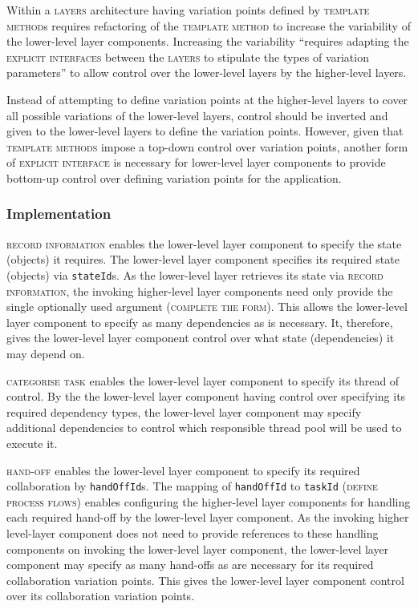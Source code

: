 \documentclass[prodmode]{style/acmlarge}
\begin{document}
Within a \textsc{layers} architecture having variation points defined by
\textsc{template method}s requires refactoring of the \textsc{template method}
to increase the variability of the lower-level layer components.  Increasing the
variability ``requires adapting the \textsc{explicit interfaces} between the
\textsc{layers} to stipulate the types of variation parameters'' \cite[p.
5]{ioc} to allow control over the lower-level layers by the higher-level layers.

Instead of attempting to define variation points at the higher-level layers to
cover all possible variations of the lower-level layers, control should be
inverted and given to the lower-level layers to define the variation points. 
However, given that \textsc{template methods} impose a top-down control over
variation points, another form of \textsc{explicit interface} is necessary for
lower-level layer components to provide bottom-up control over defining
variation points for the application.



\subsubsection*{Implementation}

\textsc{record information} enables the lower-level layer component to specify
the state (objects) it requires.  The lower-level layer component specifies its
required state (objects) via \texttt{stateId}s.  As the lower-level layer
retrieves its state via \textsc{record information}, the invoking higher-level
layer components need only provide the single optionally used argument
(\textsc{complete the form}).  This allows the lower-level layer component to
specify as many dependencies as is necessary.  It, therefore, gives the
lower-level layer component control over what state (dependencies) it
may depend on.

\textsc{categorise task} enables the lower-level layer component to specify its
thread of control.  By the the lower-level layer component having control over
specifying its required dependency types, the lower-level layer component may
specify additional dependencies to control which responsible thread pool will be
used to execute it.

\textsc{hand-off} enables the lower-level layer component to specify its
required collaboration by \texttt{handOffId}s.  The mapping of
\texttt{handOffId} to \texttt{taskId} (\textsc{define process flows}) enables
configuring the higher-level layer components for handling each required
hand-off by the lower-level layer component.  As the invoking higher level-layer
component does not need to provide references to these handling components on
invoking the lower-level layer component, the lower-level layer component may
specify as many hand-offs as are necessary for its required collaboration
variation points.  This gives the lower-level layer component control over its
collaboration variation points.
\end{document}
